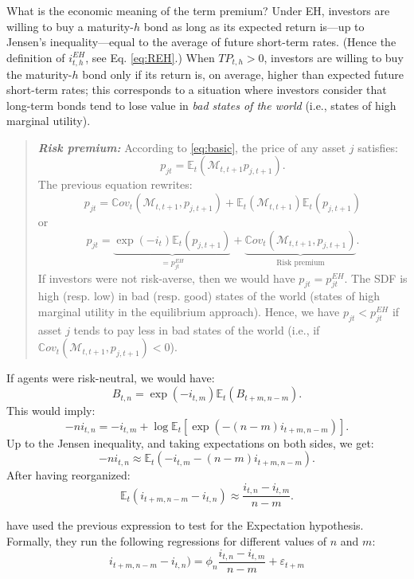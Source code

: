 \documentclass[
  12pt,
]{book}
\theoremstyle{definition}
\theoremstyle{definition}
\theoremstyle{definition}
\theoremstyle{definition}
\theoremstyle{remark}
\begin{document}
What is the economic meaning of the term premium? Under EH, investors are willing to buy a maturity-\(h\) bond as long as its expected return is---up to Jensen's inequality---equal to the average of future short-term rates. (Hence the definition of \(i^{EH}_{t,h}\), see Eq. \eqref{eq:REH}.) When \(TP_{t,h}>0\), investors are willing to buy the maturity-\(h\) bond only if its return is, on average, higher than expected future short-term rates; this corresponds to a situation where investors consider that long-term bonds tend to lose value in \emph{bad states of the world} (i.e., states of high marginal utility).

\begin{quote}
\textbf{\emph{Risk premium:}} According to \eqref{eq:basic}, the price of any asset \(j\) satisfies:
\[
p_{jt} = \mathbb{E}_t(\mathcal{M}_{t,t+1} p_{j,t+1}).
\]
The previous equation rewrites:
\[
p_{jt} =  \mathbb{C}ov_t(\mathcal{M}_{t,t+1}, p_{j,t+1}) + \mathbb{E}_t(\mathcal{M}_{t,t+1})\mathbb{E}_t( p_{j,t+1})
\]
or
\begin{equation}
p_{jt} = \underbrace{\exp(-i_t)\mathbb{E}_t( p_{j,t+1})}_{=p^{EH}_{jt}} + \underbrace{\mathbb{C}ov_t(\mathcal{M}_{t,t+1}, p_{j,t+1})}_{\mbox{Risk premium}}.\label{eq:CovRP}
\end{equation}
If investors were not risk-averse, then we would have \(p_{jt} = p^{EH}_{jt}\). The SDF is high (resp. low) in bad (resp. good) states of the world (states of high marginal utility in the equilibrium approach). Hence, we have \(p_{jt}< p^{EH}_{jt}\) if asset \(j\) tends to pay less in bad states of the world (i.e., if \(\mathbb{C}ov_t(\mathcal{M}_{t,t+1}, p_{j,t+1})<0\)).
\end{quote}

If agents were risk-neutral, we would have:
\[
B_{t,n} = \exp(-i_{t,m})\mathbb{E}_t(B_{t+m,n-m}).
\]
This would imply:
\[
-n i_{t,n} = -i_{t,m} + \log \mathbb{E}_t[\exp(-(n-m) i_{t+m,n-m})].
\]
Up to the Jensen inequality, and taking expectations on both sides, we get:
\[
-n i_{t,n} \approx \mathbb{E}_t(-i_{t,m} -(n-m) i_{t+m,n-m}).
\]
After having reorganized:
\begin{equation}
\mathbb{E}_t(i_{t+m,n-m}-i_{t,n}) \approx \frac{i_{t,n}-i_{t,m}}{n-m}.\label{eq:CStheo}
\end{equation}

\citet{Campbell_Shiller_1991} have used the previous expression to test for the Expectation hypothesis. Formally, they run the following regressions for different values of \(n\) and \(m\):
\[
i_{t+m,n-m}-i_{t,n}) = \phi_n\frac{i_{t,n}-i_{t,m}}{n-m} + \varepsilon_{t+m}
\]
\end{document}
